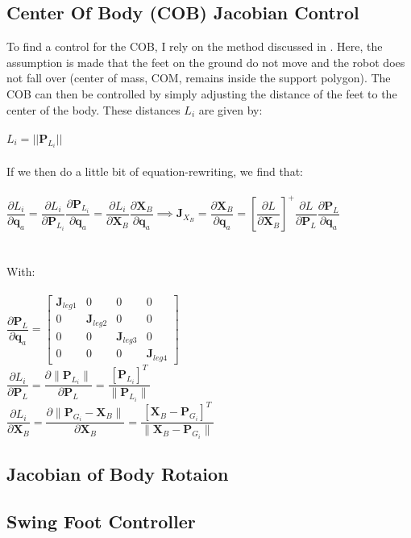 \documentclass[a4paper,10pt]{article}
\begin{document}
\subsection{Center Of Body (COB) Jacobian Control}
To find a control for the COB, I rely on the method discussed in \cite{shkolnik2007inverse}. Here, the assumption is made that the feet on the ground do not move and the robot does not fall over (center of mass, COM, remains inside the support polygon). The COB can then be controlled by simply adjusting the distance of the feet to the center of the body. These distances $L_i$ are given by:   
\\
\\
$L_i = ||\mathbf{P}_{L_i}||$
\\\\
If we then do a little bit of equation-rewriting, we find that:
\\\\
$
\dfrac{\partial{L_i}}{\partial\mathbf{q}_{a}} = \dfrac{\partial{L_i}}{\partial\mathbf{P}_{L_i}}\dfrac{\partial\mathbf{P}_{L_i}}{\partial\mathbf{q}_{a}} = \dfrac{\partial{L_i}}{\partial\mathbf{X}_{B}}\dfrac{\partial\mathbf{X}_B}{\partial\mathbf{q}_a} \implies \mathbf{J}_{X_{B}}=\dfrac{\partial\mathbf{X}_{B}}{\partial\mathbf{q}_{a}} = \left[\dfrac{\partial{L}}{\partial\mathbf{X}_{B}}\right]^+\dfrac{\partial{L}}{\partial\mathbf{P}_{L}}\dfrac{\partial\mathbf{P}_{L}}{\partial\mathbf{q}_{a}}
$
\\
\\\\
With:
\\\\
$
\dfrac{\partial\mathbf{P}_{L}}{\partial\mathbf{q}_{a}} = \begin{bmatrix}
\mathbf{J}_{leg1} & 0 & 0 & 0 \\
0 & \mathbf{J}_{leg2} & 0 & 0 \\
0 & 0 & \mathbf{J}_{leg3} & 0 \\
0 & 0 & 0 & \mathbf{J}_{leg4}  
\end{bmatrix} 
$
\vspace{5mm}
\\
$
\dfrac{\partial{L_{i}}}{\partial{\mathbf{P}_{L}}} = \dfrac{\partial\|\mathbf{P}_{L_{i}}\|}{\partial{\mathbf{P}_{L}}} = \dfrac{[\mathbf{P}_{L_{i}}]^T}{\|\mathbf{P}_{L_{i}}\|}
$
\vspace{5mm}
\\
$
\dfrac{\partial{L_{i}}}{\partial{\mathbf{X}_{B}}} = \dfrac{\partial\|\mathbf{P}_{G_{i}} - \mathbf{X}_{B}\|}{\partial{\mathbf{X}_{B}}} = \dfrac{[\mathbf{X}_{B}-\mathbf{P}_{G_{i}}]^T}{\|\mathbf{X}_{B}-\mathbf{P}_{G_{i}}\|}
$
\vspace{5mm}
\\
\subsection{Jacobian of Body Rotaion}
\subsection{Swing Foot Controller}
\end{document}

